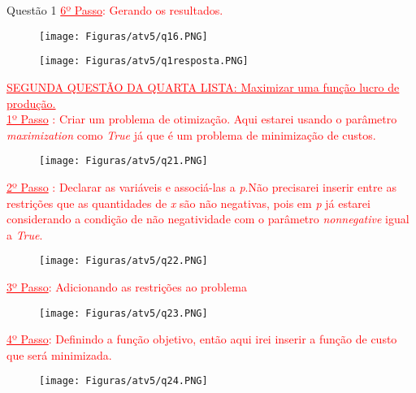 \documentclass[12pt]{article}
\begin{document}
\begin{section}{Questão 1}
\noindent \textcolor{red}{\underline{6º Passo}: Gerando os resultados.}

\begin{figure}[H]
    \centering
    \texttt{[image: Figuras/atv5/q16.PNG]}
\end{figure}

\begin{figure}[H]
    \centering
    \texttt{[image: Figuras/atv5/q1resposta.PNG]}
\end{figure}


\noindent \textcolor{red}{\underline{\underline{SEGUNDA QUESTÃO DA QUARTA LISTA: Maximizar uma função lucro de produção.}}}\\

\noindent \textcolor{red}{\underline{1º Passo} : Criar um problema de otimização. Aqui estarei usando o parâmetro \textit{maximization} como \textit{True} já que é um problema de minimização de custos.}

\begin{figure}[H]
    \centering
    \texttt{[image: Figuras/atv5/q21.PNG]}
\end{figure}

\noindent \textcolor{red}{\underline{2º Passo} : Declarar as variáveis e associá-las a \textit{p}.Não precisarei inserir entre as restrições que as quantidades de \textit{x} são não negativas, pois em \textit{p} já estarei considerando a condição de não negatividade com o parâmetro \textit{nonnegative} igual a \textit{True}.}\\

\begin{figure}[H]
    \centering
    \texttt{[image: Figuras/atv5/q22.PNG]}
\end{figure}

\noindent \textcolor{red}{\underline{3º Passo}: Adicionando as restrições ao problema}

\begin{figure}[H]
    \centering
    \texttt{[image: Figuras/atv5/q23.PNG]}
\end{figure}

\noindent \textcolor{red}{\underline{4º Passo}: Definindo a função objetivo, então aqui irei inserir a função de custo que será minimizada.}

\begin{figure}[H]
    \centering
    \texttt{[image: Figuras/atv5/q24.PNG]}
\end{figure}


\end{section}
\end{document}
